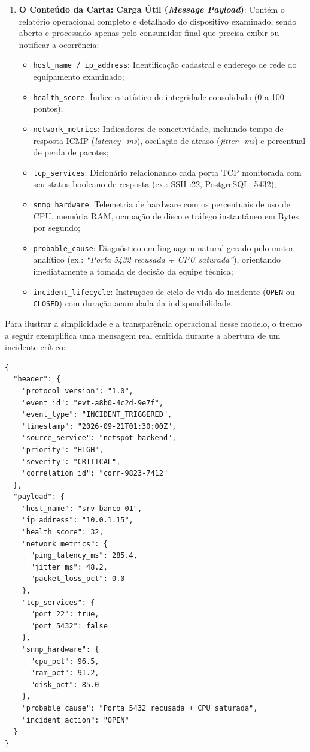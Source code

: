 \documentclass[12pt,a4paper]{article}
\begin{document}
\begin{enumerate}[leftmargin=1.25cm]
\item \textbf{O Conteúdo da Carta: Carga Útil (\textit{Message Payload})}: Contém o relatório operacional completo e detalhado do dispositivo examinado, sendo aberto e processado apenas pelo consumidor final que precisa exibir ou notificar a ocorrência:
  \begin{itemize}
  \item \texttt{host\_name / ip\_address}: Identificação cadastral e endereço de rede do equipamento examinado;
  \item \texttt{health\_score}: Índice estatístico de integridade consolidado (0 a 100 pontos);
  \item \texttt{network\_metrics}: Indicadores de conectividade, incluindo tempo de resposta ICMP (\textit{latency\_ms}), oscilação de atraso (\textit{jitter\_ms}) e percentual de perda de pacotes;
  \item \texttt{tcp\_services}: Dicionário relacionando cada porta TCP monitorada com seu status booleano de resposta (ex.: SSH :22, PostgreSQL :5432);
  \item \texttt{snmp\_hardware}: Telemetria de hardware com os percentuais de uso de CPU, memória RAM, ocupação de disco e tráfego instantâneo em Bytes por segundo;
  \item \texttt{probable\_cause}: Diagnóstico em linguagem natural gerado pelo motor analítico (ex.: \textit{``Porta 5432 recusada + CPU saturada''}), orientando imediatamente a tomada de decisão da equipe técnica;
  \item \texttt{incident\_lifecycle}: Instruções de ciclo de vida do incidente (\texttt{OPEN} ou \texttt{CLOSED}) com duração acumulada da indisponibilidade.
  \end{itemize}
\end{enumerate}

Para ilustrar a simplicidade e a transparência operacional desse modelo, o trecho a seguir exemplifica uma mensagem real emitida durante a abertura de um incidente crítico:

\begin{verbatim}
{
  "header": {
    "protocol_version": "1.0",
    "event_id": "evt-a8b0-4c2d-9e7f",
    "event_type": "INCIDENT_TRIGGERED",
    "timestamp": "2026-09-21T01:30:00Z",
    "source_service": "netspot-backend",
    "priority": "HIGH",
    "severity": "CRITICAL",
    "correlation_id": "corr-9823-7412"
  },
  "payload": {
    "host_name": "srv-banco-01",
    "ip_address": "10.0.1.15",
    "health_score": 32,
    "network_metrics": {
      "ping_latency_ms": 285.4,
      "jitter_ms": 48.2,
      "packet_loss_pct": 0.0
    },
    "tcp_services": {
      "port_22": true,
      "port_5432": false
    },
    "snmp_hardware": {
      "cpu_pct": 96.5,
      "ram_pct": 91.2,
      "disk_pct": 85.0
    },
    "probable_cause": "Porta 5432 recusada + CPU saturada",
    "incident_action": "OPEN"
  }
}
\end{verbatim}
\end{document}
